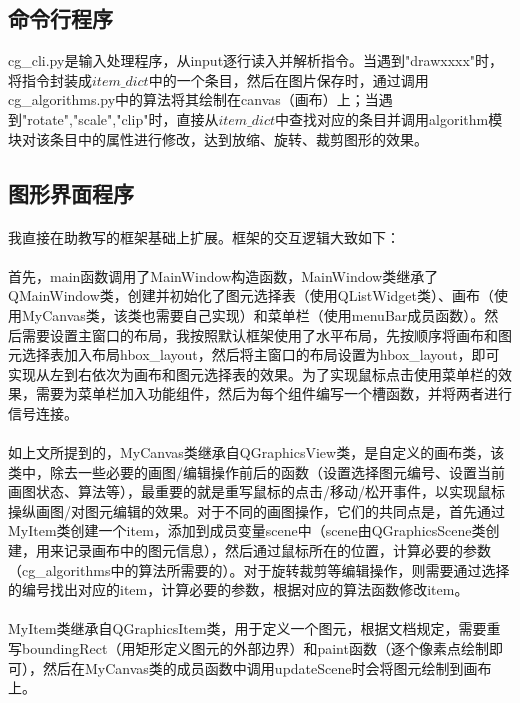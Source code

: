 \documentclass[a4paper,UTF8]{article}
\theoremstyle{definition}
\begin{document}
\subsection{命令行程序}
cg\_cli.py是输入处理程序，从input逐行读入并解析指令。当遇到"drawxxxx"时，将指令封装成$item\_dict$中的一个条目，然后在图片保存时，通过调用cg\_algorithms.py中的算法将其绘制在canvas（画布）上；当遇到"rotate","scale","clip"时，直接从$item\_dict$中查找对应的条目并调用algorithm模块对该条目中的属性进行修改，达到放缩、旋转、裁剪图形的效果。

\subsection{图形界面程序}
\paragraph{}我直接在助教写的框架基础上扩展。框架的交互逻辑大致如下：
\paragraph{}首先，main函数调用了MainWindow构造函数，MainWindow类继承了QMainWindow类，创建并初始化了图元选择表（使用QListWidget类）、画布（使用MyCanvas类，该类也需要自己实现）和菜单栏（使用menuBar成员函数）。然后需要设置主窗口的布局，我按照默认框架使用了水平布局，先按顺序将画布和图元选择表加入布局hbox\_layout，然后将主窗口的布局设置为hbox\_layout，即可实现从左到右依次为画布和图元选择表的效果。为了实现鼠标点击使用菜单栏的效果，需要为菜单栏加入功能组件，然后为每个组件编写一个槽函数，并将两者进行信号连接。
\paragraph{}如上文所提到的，MyCanvas类继承自QGraphicsView类，是自定义的画布类，该类中，除去一些必要的画图/编辑操作前后的函数（设置选择图元编号、设置当前画图状态、算法等），最重要的就是重写鼠标的点击/移动/松开事件，以实现鼠标操纵画图/对图元编辑的效果。对于不同的画图操作，它们的共同点是，首先通过MyItem类创建一个item，添加到成员变量scene中（scene由QGraphicsScene类创建，用来记录画布中的图元信息），然后通过鼠标所在的位置，计算必要的参数（cg\_algorithms中的算法所需要的）。对于旋转裁剪等编辑操作，则需要通过选择的编号找出对应的item，计算必要的参数，根据对应的算法函数修改item。
\paragraph{}MyItem类继承自QGraphicsItem类，用于定义一个图元，根据文档规定，需要重写boundingRect（用矩形定义图元的外部边界）和paint函数（逐个像素点绘制即可），然后在MyCanvas类的成员函数中调用updateScene时会将图元绘制到画布上。
\end{document}
